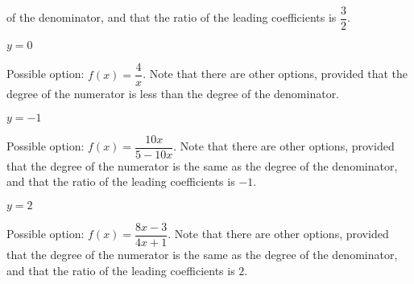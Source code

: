 \begin{exercises}
\begin{problem}
\begin{multicols}{4}
\begin{subproblem}
\begin{shortsolution}
			of the denominator, and that the ratio of the leading
			coefficients is $\dfrac{3}{2}$.
		\end{shortsolution}
	\end{subproblem}
	\begin{subproblem}
		$y=0$
		\begin{shortsolution}
			Possible option: $f(x)=\dfrac{4}{x}$. Note that there
			are other options, provided that the degree of the numerator is less than the degree
			of the denominator.
		\end{shortsolution}
	\end{subproblem}
	\begin{subproblem}
		$y=-1$
		\begin{shortsolution}
			Possible option: $f(x)=\dfrac{10x}{5-10x}$. Note that there
			are other options, provided that the degree of the numerator is the same as the degree
			of the denominator, and that the ratio of the leading
			coefficients is $-1$.
		\end{shortsolution}
	\end{subproblem}
	\begin{subproblem}
		$y=2$
		\begin{shortsolution}
			Possible option: $f(x)=\dfrac{8x-3}{4x+1}$. Note that there
			are other options, provided that the degree of the numerator is the same as the degree
			of the denominator, and that the ratio of the leading
			coefficients is $2$.
		\end{shortsolution}
	\end{subproblem}
\end{multicols}
\end{problem}


\end{exercises}
